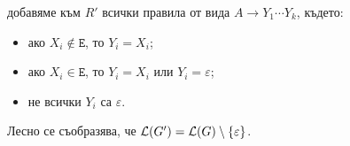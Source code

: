 \begin{hint}
\begin{enumerate}[1)]
    добавяме към $R'$ всички правила от вида $A \to Y_1\cdots Y_k$, където:
    \begin{itemize}[-]
    \item 
      ако $X_i \not\in \texttt{E}$, то $Y_i = X_i$;
    \item
      ако $X_i \in \texttt{E}$, то $Y_i = X_i$ или $Y_i = \varepsilon$;
    \item
      не всички $Y_i$ са $\varepsilon$.
    \end{itemize}
    Лесно се съобразява, че $\mathcal{L}(G') = \mathcal{L}(G) \setminus \{\varepsilon\}$.
  \end{enumerate}
\end{hint}

